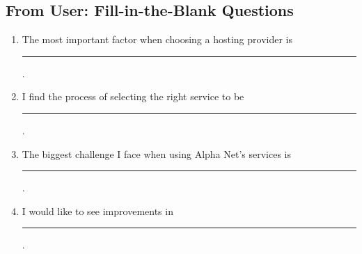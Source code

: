 \subsection*{From User: Fill-in-the-Blank Questions}
\begin{enumerate}
    \item The most important factor when choosing a hosting provider is \rule{5cm}{0.15mm}.
    \item I find the process of selecting the right service to be \rule{5cm}{0.15mm}.
    \item The biggest challenge I face when using Alpha Net's services is \rule{5cm}{0.15mm}.
    \item I would like to see improvements in \rule{5cm}{0.15mm}.
\end{enumerate}

